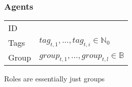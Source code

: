 \subsubsection{Agents}
\begin{tabular}{|p{3.5cm}||p{4.75cm}|}
\hline
    ID                	&  \\
    Tags                & $tag_{t,1},...,tag_{t,i}\in\mathbb{N}_0$ \\
    Group				& $group_{t,1},...,group_{t,l}\in\mathbb{B}$ \\
\hline
\end{tabular}
Roles are essentially just groups
